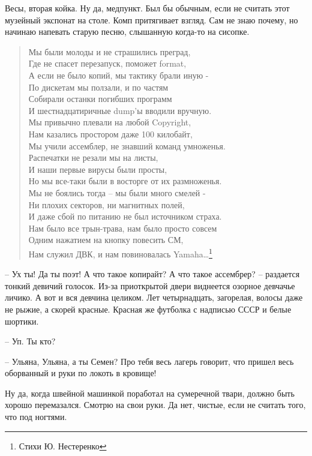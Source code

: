 \documentclass[a4paper]{book}
\begin{document}
Весы, вторая койка. Ну да, медпункт. Был бы обычным, если не считать этот музейный экспонат на столе. Комп притягивает взгляд. Сам не знаю почему, но начинаю напевать старую песню, слышанную когда-то на сисопке.
\begin{verse}
Мы были молоды и не страшились преград,\\
Где не спасет перезапуск, поможет format,\\
А если не было копий, мы тактику брали иную -\\
По дискетам мы ползали, и по частям\\
Собирали останки погибших программ\\
И шестнадцатиричные dump'ы вводили вручную.\\
\bigskip
Мы привычно плевали на любой Copyright,\\
Нам казались простором даже 100 килобайт,\\
Мы учили ассемблер, не знавший команд умноженья.\\
Распечатки не резали мы на листы,\\
И наши первые вирусы были просты,\\
Но мы все-таки были в восторге от их размноженья.\\
\bigskip
Мы не боялись тогда -- мы были много смелей -\\
Ни плохих секторов, ни магнитных полей,\\
И даже сбой по питанию не был источником страха.\\
Нам было все трын-трава, нам было просто совсем\\
Одним нажатием на кнопку повесить СМ,\\
Нам служил ДВК, и нам повиновалась Yamaha\ldots\footnote{Стихи Ю. Нестеренко}
\end{verse}

-- Ух ты! Да ты поэт! А что такое копирайт? А что такое ассембрер? -- раздается тонкий девичий голосок. Из-за приоткрытой двери виднеется озорное девчачье личико. А вот и вся девчина целиком. Лет четырнадцать, загорелая, волосы даже не рыжие, а скорей красные. Красная же футболка с надписью СССР и белые шортики.

-- Уп. Ты кто? 

-- Ульяна, Ульяна, а ты Семен? Про тебя весь лагерь говорит, что пришел весь оборванный и руки по локоть в кровище!  

Ну да, когда швейной машинкой поработал на сумеречной твари, должно быть хорошо перемазался. Смотрю на свои руки. Да нет, чистые, если не считать того, что под ногтями. 
\end{document}
